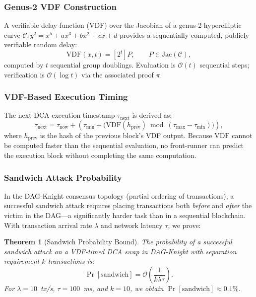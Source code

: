 \documentclass[12pt,a4paper]{article}
\newtheorem{theorem}{Theorem}[section]
\begin{document}
\subsubsection{Genus-2 VDF Construction}

A verifiable delay function (VDF) over the Jacobian of a genus-2
hyperelliptic curve $\mathcal{C}: y^2 = x^5 + ax^3 + bx^2 + cx + d$ provides
a sequentially computed, publicly verifiable random delay:
\begin{equation}
\mathrm{VDF}(x, t) = [2^t] P, \qquad P \in \mathrm{Jac}(\mathcal{C}),
\end{equation}
computed by $t$ sequential group doublings.  Evaluation is $\mathcal{O}(t)$
sequential steps; verification is $\mathcal{O}(\log t)$ via the associated
proof $\pi$.

\subsubsection{VDF-Based Execution Timing}

The next DCA execution timestamp $\tau_\mathrm{next}$ is derived as:
\begin{equation}
\tau_\mathrm{next} = \tau_\mathrm{now} +
    \left(\tau_\mathrm{min} + \bigl(\mathrm{VDF}(h_\mathrm{prev}) \bmod
    (\tau_\mathrm{max} - \tau_\mathrm{min})\bigr)\right),
\label{eq:vdf-timing}
\end{equation}
where $h_\mathrm{prev}$ is the hash of the previous block's VDF output.
Because $\mathrm{VDF}$ cannot be computed faster than the sequential evaluation,
no front-runner can predict the execution block without completing the
same computation.

\subsubsection{Sandwich Attack Probability}

In the DAG-Knight consensus topology (partial ordering of transactions), a
successful sandwich attack requires placing transactions both \emph{before}
and \emph{after} the victim in the DAG—a significantly harder task than in
a sequential blockchain.  With transaction arrival rate $\lambda$ and network
latency $\tau$, we prove:
\begin{theorem}[Sandwich Probability Bound]
\label{thm:sandwich}
The probability of a successful sandwich attack on a VDF-timed DCA swap in
DAG-Knight with separation requirement $k$ transactions is:
\begin{equation}
\Pr[\mathrm{sandwich}] = \mathcal{O}\!\left(\frac{1}{k\lambda\tau}\right).
\label{eq:sandwich-prob}
\end{equation}
For $\lambda = 10$~tx/s, $\tau = 100$~ms, and $k = 10$, we obtain
$\Pr[\mathrm{sandwich}] \approx 0.1\%$.
\end{theorem}
\end{document}
